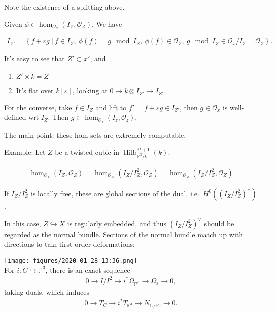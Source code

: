 \begin{description}
Note the existence of a splitting above.

Given \(\phi \in \hom_{{\mathcal{O}}_x}(I_Z, {\mathcal{O}}_Z)\). We have

\begin{align*} I_{Z'} = \left\{{f + \varepsilon g {~\mathrel{\Big|}~}f\in I_Z,~ \phi(f) = g \mod I_Z,~ \phi(f) \in {\mathcal{O}}_Z,~ g\mod I_Z \in {\mathcal{O}}_x/I_Z = {\mathcal{O}}_Z}\right\} .\end{align*}

It's easy to see that \(Z' \subset x'\), and

\begin{enumerate}
\def\labelenumi{\arabic{enumi}.}
\tightlist
\item
  \(Z'\times k = Z\)
\item
  It's flat over \(k[\varepsilon]\), looking at
  \(0 \to k\otimes I_{Z'} \to I_{Z'}\).
\end{enumerate}

For the converse, take \(f\in I_Z\) and lift to
\(f' = f + \varepsilon g \in I_{Z'}\), then \(g\in {\mathcal{O}}_x\) is
well-defined wrt \(I_Z\). Then
\(g\in \hom_{{\mathcal{O}}_x}(I_z, {\mathcal{O}}_z)\).
\end{description}

The main point: these hom sets are extremely computable.

Example: Let \(Z\) be a twisted cubic in
\(\operatorname{Hilb}_{{\mathbb{P}}^3/k}^{3t+1}(k)\).

\begin{description}
\tightlist
\item[Observation]
\begin{align*}
  \hom_{{\mathcal{O}}_x}(I_Z, {\mathcal{O}}_Z) = \hom_{{\mathcal{O}}_X}(I_Z/I_Z^2, {\mathcal{O}}_Z) = \hom_{{\mathcal{O}}_Z}(I_Z/I_Z^2, {\mathcal{O}}_Z)
  \end{align*}
\end{description}

If \(I_Z/I_Z^2\) is locally free, these are global sections of the dual,
i.e.~\(H^0((I_Z/I_Z^2)^\vee)\).

In this case, \(Z\hookrightarrow X\) is regularly embedded, and thus
\((I_Z/I_Z^2)^\vee\) should be regarded as the normal bundle. Sections
of the normal bundle match up with directions to take first-order
deformations:

\texttt{[image: figures/2020-01-28-13:36.png]}\\

For \(i:C \hookrightarrow{\mathbb{P}}^3\), there is an exact sequence
\begin{align*}
0 \to I/I^2 \to i^* \Omega_{{\mathbb{P}}^3} \to \Omega_\varepsilon\to 0
,\end{align*}
taking duals, which induces
\begin{align*}
0 \to T_C \to i^* T_{{\mathbb{P}}^3} \to N_{C/{\mathbb{P}}^3} \to 0
.\end{align*}

